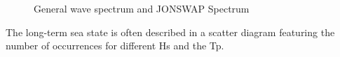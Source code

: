 \begin{figure}[H]
\hfill
{}\hfill
\caption[$\; \:$General wave spectrum and JONSWAP Spectrum]{General wave spectrum and JONSWAP Spectrum \cite{Faltinsen1990}}
\label{fig:spectrum}
\end{figure}

\noindent The long-term sea state is often described in a scatter diagram featuring the number of occurrences for different Hs and the Tp.  \newline
\newline\newline

